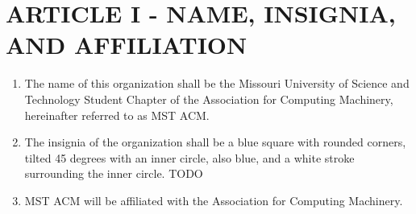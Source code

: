 \section{ARTICLE I - NAME, INSIGNIA, AND AFFILIATION}
\begin{enumerate}[label=\Alph*.]
  \item The name of this organization shall be the Missouri University of
  Science and Technology Student Chapter of the Association for Computing
  Machinery, hereinafter referred to as MST ACM.
  \item The insignia of the organization shall be a blue square with rounded
    corners, tilted 45 degrees with an inner circle, also blue, and a white
    stroke surrounding the inner circle. TODO
  \item MST ACM will be affiliated with the Association for Computing Machinery.
\end{enumerate}
